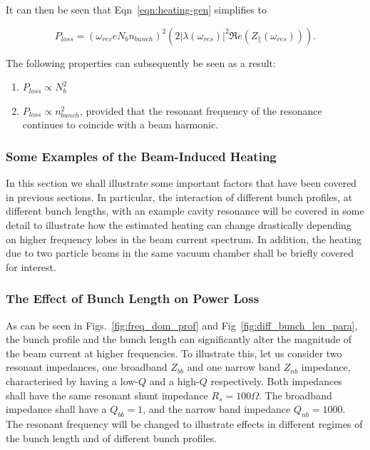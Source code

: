It can then be seen that Eqn~\ref{eqn:heating-gen} simplifies to

\begin{equation}
P_{loss} = \left( \omega_{rev}eN_{b}n_{bunch}  \right)^{2}  \left( 2 \left| \lambda \left( \omega_{res} \right)  \right|^{2}  \Re{}e \left( Z_{\parallel} \left(\omega_{res} \right) \right) \right). 
\label{eqn:heating-high-q}
\end{equation}

The following properties can subsequently be seen as a result:

\begin{enumerate}
\item{$P_{loss} \propto N_{b}^{2}$}
\item{$P_{loss} \propto n_{bunch}^{2}$, provided that the resonant frequency of the resonance continues to coincide with a beam harmonic.}
\end{enumerate}

\subsubsection{Some Examples of the Beam-Induced Heating}

In this section we shall illustrate some important factors that have been covered in previous sections. In particular, the interaction of different bunch profiles, at different bunch lengths, with an example cavity resonance will be covered in some detail to illustrate how the estimated heating can change drastically depending on higher frequency lobes in the beam current spectrum. In addition, the heating due to two particle beams in the same vacuum chamber shall be briefly covered for interest.

\subsubsection{The Effect of Bunch Length on Power Loss}

As can be seen in Figs.~\ref{fig:freq_dom_prof} and Fig~\ref{fig:diff_bunch_len_para}, the bunch profile and the bunch length can significantly alter the magnitude of the beam current at higher frequencies. To illustrate this, let us consider two resonant impedances, one broadband $Z_{bb}$ and one narrow band $Z_{nb}$ impedance, characterised by having a low-$Q$ and a high-$Q$ respectively. Both impedances shall have the same resonant shunt impedance $R_{s} = 100\Omega$. The broadband impedance shall have a $Q_{bb}=1$, and the narrow band impedance $Q_{nb}=1000$. The resonant frequency will be changed to illustrate effects in different regimes of the bunch length and of different bunch profiles.


